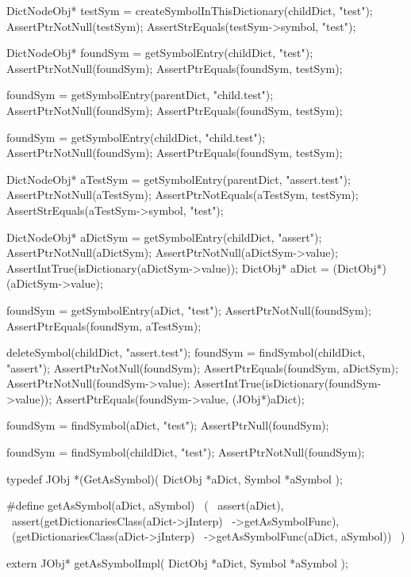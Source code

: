   DictNodeObj* testSym = 
    createSymbolInThisDictionary(childDict, "test");
  AssertPtrNotNull(testSym);
  AssertStrEquals(testSym->symbol, "test");
  
  DictNodeObj* foundSym =
    getSymbolEntry(childDict, "test");
  AssertPtrNotNull(foundSym);
  AssertPtrEquals(foundSym, testSym);

  foundSym = getSymbolEntry(parentDict, "child.test");
  AssertPtrNotNull(foundSym);
  AssertPtrEquals(foundSym, testSym);
  
  foundSym = getSymbolEntry(childDict, "child.test");
  AssertPtrNotNull(foundSym);
  AssertPtrEquals(foundSym, testSym);
  
  DictNodeObj* aTestSym =
    getSymbolEntry(parentDict, "assert.test");
  AssertPtrNotNull(aTestSym);
  AssertPtrNotEquals(aTestSym, testSym);
  AssertStrEquals(aTestSym->symbol, "test");
  
  DictNodeObj* aDictSym =
    getSymbolEntry(childDict, "assert");
  AssertPtrNotNull(aDictSym);
  AssertPtrNotNull(aDictSym->value);
  AssertIntTrue(isDictionary(aDictSym->value));
  DictObj* aDict = (DictObj*)(aDictSym->value);
  
  foundSym = getSymbolEntry(aDict, "test");
  AssertPtrNotNull(foundSym);
  AssertPtrEquals(foundSym, aTestSym);
  
  deleteSymbol(childDict, "assert.test");
  foundSym = findSymbol(childDict, "assert");
  AssertPtrNotNull(foundSym);
  AssertPtrEquals(foundSym, aDictSym);
  AssertPtrNotNull(foundSym->value);
  AssertIntTrue(isDictionary(foundSym->value));
  AssertPtrEquals(foundSym->value, (JObj*)aDict);
  
  foundSym = findSymbol(aDict, "test");
  AssertPtrNull(foundSym);
  
  foundSym = findSymbol(childDict, "test");
  AssertPtrNotNull(foundSym);
\stopCTest
\stopTestCase
\stopTestSuite

\startTestSuite[getAsSymbol]

\startCHeader
typedef JObj *(GetAsSymbol)(
  DictObj *aDict,
  Symbol  *aSymbol
);

#define getAsSymbol(aDict, aSymbol)             \
  (                                             \
    assert(aDict),                              \
    assert(getDictionariesClass(aDict->jInterp) \
      ->getAsSymbolFunc),                       \
    (getDictionariesClass(aDict->jInterp)       \
      ->getAsSymbolFunc(aDict, aSymbol))        \
  )
\stopCHeader

\setCHeaderStream{private}
\startCHeader
extern JObj* getAsSymbolImpl(
  DictObj *aDict,
  Symbol  *aSymbol
);
\stopCHeader
\setCHeaderStream{public}

